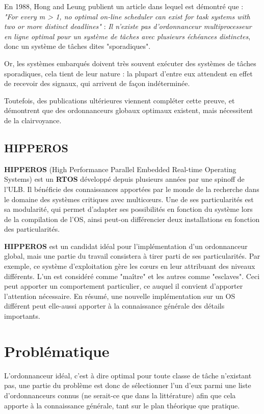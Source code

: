 \documentclass[11pt,a4paper,oneside]{report}
\begin{document}
En 1988, Hong and Leung \cite{hong_-line_1988} publient un article dans lequel est 
démontré que : \\
\textit{"For every m > 1, no optimal on-line scheduler can exist for task systems with two or more distinct deadlines"} : 
\textit{Il n'existe pas d'ordonnanceur multiprocesseur en ligne optimal pour un système de tâches 
avec plusieurs échéances distinctes}, donc un système de tâches dites "sporadiques".

Or, les systèmes embarqués doivent très souvent exécuter des systèmes de tâches sporadiques, 
cela tient de leur nature : la plupart d'entre eux attendent en effet de recevoir des 
signaux, qui arrivent de façon indéterminée.

Toutefois, des publications ultérieures viennent compléter cette preuve, et démontrent 
que des ordonnanceurs globaux optimaux existent, mais nécessitent de la clairvoyance.




\subsection{HIPPEROS}
\textbf{HIPPEROS} (High Performance Parallel Embedded Real-time Operating Systems)
est un \textbf{RTOS} développé depuis plusieurs années par une spinoff de l'ULB.
Il bénéficie des connaissances apportées par le monde de la recherche dans 
le domaine des systèmes critiques avec multic\oe{}urs. Une de ses particularités 
est sa modularité, qui permet d'adapter ses possibilités en fonction du système 
lors de la compilation de l'OS, ainsi peut-on différencier deux installations 
en fonction des particularités.

\textbf{HIPPEROS} est un candidat idéal pour l'implémentation d'un ordonnanceur 
global, mais une partie du travail consistera à tirer parti de ses particularités. 
Par exemple, ce système d'exploitation gère les c\oe{}urs en leur attribuant des 
niveaux différents. L'un est considéré comme "maître" et les autres comme "esclaves". 
Ceci peut apporter un comportement particulier, ce auquel il convient d'apporter 
l'attention nécessaire. En résumé, une nouvelle implémentation sur un OS différent 
peut elle-aussi apporter à la connaissance générale des détails importants.


\section{Problématique}
L'ordonnanceur idéal, c'est à dire optimal pour toute classe de tâche n'existant pas, 
une partie du problème est donc de sélectionner l'un d'eux parmi une liste 
d'ordonnanceurs connus (ne serait-ce que dans la littérature) afin que cela apporte 
à la connaissance générale, tant sur le plan théorique que pratique.
\end{document}
